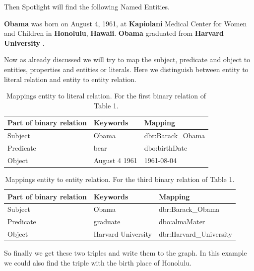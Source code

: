 \documentclass[runningheads]{llncs}
\begin{document}
Then Spotlight will find the following Named Entities.

\begin{example}
\textbf{Obama} was born on August 4, 1961, at \textbf{Kapiolani} Medical Center for
Women and Children in \textbf{Honolulu}, \textbf{Hawaii}. \textbf{Obama} graduated from
\textbf{Harvard University} .\end{example}

Now as already discussed we will try to map the subject, predicate and object to entities, properties and entities or literals. Here we distinguish between entity to literal relation and entity to entity relation.

\begin{table}
	\caption{Mappings entity to literal relation. For the first binary relation of Table 1.}\label{tab2}
	\begin{center}
		\begin{tabularx}{\textwidth}{@{}|l|l|Y|@{}}
			\hline
			\textbf{Part of binary relation} &  \textbf{Keywords} & \textbf{Mapping}\\
			\hline
			Subject &  Obama & dbr:Barack\_Obama\\
			Predicate &  bear & dbo:birthDate\\
			Object &  August 4 1961  & 1961-08-04\\
			\hline
		\end{tabularx}
	\end{center}
\end{table}



\begin{table}
	\caption{Mappings entity to entity relation. For the third binary relation of Table 1.}\label{tab3}
	\begin{center}
		\begin{tabularx}{\textwidth}{@{}|l|l|Y|@{}}
			\hline
			\textbf{Part of binary relation} &  \textbf{Keywords} & \textbf{Mapping}\\
			\hline
			Subject &  Obama & dbr:Barack\_Obama\\
			Predicate &  graduate & dbo:almaMater\\
			Object &  Harvard University  & dbr:Harvard\_University\\
			\hline
		\end{tabularx}
	\end{center}
\end{table}
So finally we get these two triples and write them to the graph. In this example we could also find the triple with the birth place of Honolulu. 
\end{document}
